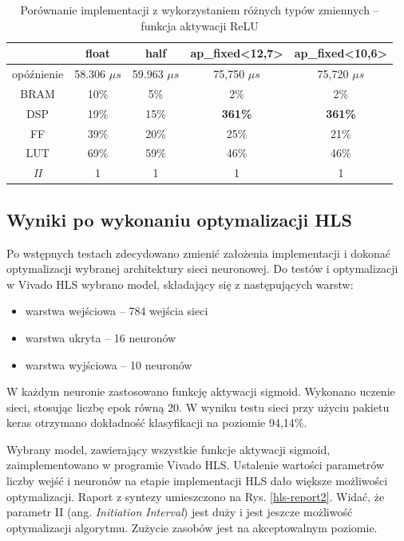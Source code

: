 \begin{table}[h] \centering
  \caption{Porównanie implementacji z wykorzystaniem różnych typów zmiennych -- funkcja aktywacji ReLU}
  \centering
  \begin{tabular} {c|c|c|c|c} \hline \label{tab:fixed-vs-float-relu}  
                  & float           & half            & ap\_fixed<12,7> & ap\_fixed<10,6> \\ \hline
    opóźnienie    & 58.306 $\mu s$  & 59.963 $\mu s$  & 75,750 $\mu s$  & 75,720 $\mu s$  \\
    BRAM          & 10\%             & 5\%             & 2\%             & 2\%            \\
    DSP           & 19\%            & 15\%             & \textbf{361\%}  & \textbf{361\%} \\
    FF            & 39\%            & 20\%            & 25\%            & 21\%            \\
    LUT           & 69\%            & 59\%            & 46\%            & 46\%            \\
    \emph{II}     & 1               & 1               & 1               & 1               \\
  \end{tabular}
\end{table}


\subsection{Wyniki po wykonaniu optymalizacji HLS}
Po wstępnych testach zdecydowano zmienić założenia implementacji i dokonać optymalizacji wybranej architektury sieci neuronowej. Do testów i optymalizacji w Vivado HLS wybrano model, składający się z następujących warstw:

\begin{itemize}
  \item warstwa wejściowa -- 784 wejścia sieci
  \item warstwa ukryta  -- 16 neuronów
  \item warstwa wyjściowa -- 10 neuronów
\end{itemize}

W każdym neuronie zastosowano funkcję aktywacji sigmoid. Wykonano uczenie sieci, stosując liczbę epok równą 20.
W wyniku testu sieci przy użyciu pakietu keras otrzymano dokładność klasyfikacji na poziomie 94,14\%.

Wybrany model, zawierający wszystkie funkcje aktywacji sigmoid, zaimplementowano w programie Vivado HLS. Ustalenie wartości parametrów liczby wejść i neuronów na etapie implementacji HLS dało większe możliwości optymalizacji. Raport z syntezy umieszczono na Rys. \ref{hls-report2}. Widać, że parametr II (ang. \emph{Initiation Interval}) jest duży i jest jeszcze możliwość optymalizacji algorytmu. Zużycie zasobów jest na akceptowalnym poziomie.

